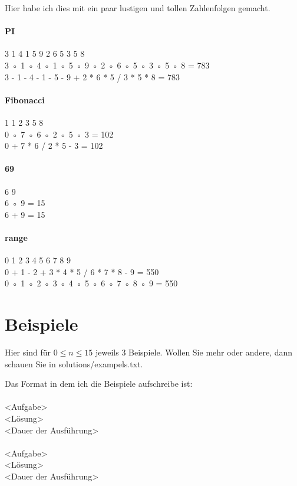 \documentclass[a4paper,10pt,ngerman]{scrartcl}
\begin{document}
Hier habe ich dies mit ein paar lustigen und tollen Zahlenfolgen gemacht.

\paragraph{PI}

3 1 4 1 5 9 2 6 5 3 5 8\\
3 ◦ 1 ◦ 4 ◦ 1 ◦ 5 ◦ 9 ◦ 2 ◦ 6 ◦ 5 ◦ 3 ◦ 5 ◦ 8 = 783\\
3 - 1 - 4 - 1 - 5 - 9 + 2 * 6 * 5 / 3 * 5 * 8 = 783

\paragraph{Fibonacci}

1 1 2 3 5 8\\
0 ◦ 7 ◦ 6 ◦ 2 ◦ 5 ◦ 3 = 102\\
0 + 7 * 6 / 2 * 5 - 3 = 102

\paragraph{69}

6 9\\
6 ◦ 9 = 15\\
6 + 9 = 15

\paragraph{range}

0 1 2 3 4 5 6 7 8 9\\
0 + 1 - 2 + 3 * 4 * 5 / 6 * 7 * 8 - 9 = 550\\
0 ◦ 1 ◦ 2 ◦ 3 ◦ 4 ◦ 5 ◦ 6 ◦ 7 ◦ 8 ◦ 9 = 550

\section{Beispiele}

Hier sind für $0 \leq n \leq 15$ jeweils 3 Beispiele. Wollen Sie mehr oder andere, dann schauen Sie in solutions/exampels.txt.

Das Format in dem ich die Beispiele aufschreibe ist:
\\
\\
<Aufgabe>\\
<Lösung>\\
<Dauer der Ausführung>\\
\\
<Aufgabe>\\
<Lösung>\\
<Dauer der Ausführung>\\
\end{document}
